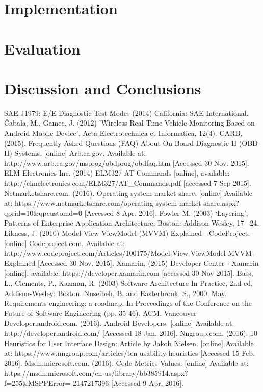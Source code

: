 \documentclass[12pt]{report}
\begin{document}
	\chapter{Implementation}
		
	\newpage

	\chapter{Evaluation}
		
	\newpage
	
	\chapter{Discussion and Conclusions}
				
	\newpage	
	

	\begin{thebibliography}{15}
		
		 SAE J1979:  E/E Diagnostic Test Modes (2014) California: SAE International.		
		 {\v C}abala, M., Gamec, J. (2012) 'Wireless Real-Time Vehicle Monitoring Based on Android Mobile Device', Acta Electrotechnica et Informatica, 12(4).
		 CARB, (2015). Frequently Asked Questions (FAQ) About On-Board Diagnostic II (OBD II) Systems. [online] Arb.ca.gov. Available at: http://www.arb.ca.gov/msprog/obdprog/obdfaq.htm [Accessed 30 Nov. 2015].
		 ELM Electronics Inc. (2014) ELM327 AT Commands [online], available: 	http://elmelectronics.com/ELM327/AT{\_}Commands.pdf [accessed 7 Sep 2015].
		 Netmarketshare.com. (2016). Operating system market share. [online] Available at: https://www.netmarketshare.com/operating-system-market-share.aspx?qprid=10{\&}qpcustomd=0 [Accessed 8 Apr. 2016].		
		 Fowler M. (2003) ‘Layering’, Patterns of Enterprise
	Application Architecture, Boston: Addison-Wesley, 17{-–}24.
		 Likness, J. (2010) Model-View-ViewModel (MVVM) Explained - CodeProject. [online] Codeproject.com. Available at: http://www.codeproject.com/Articles/100175/Model-View-ViewModel-MVVM-Explained [Accessed 30 Nov. 2015].
		 Xamarin, (2015) Developer Center - Xamarin [online], available: https://developer.xamarin.com [accessed 30 Nov 2015].
		 Bass, L., Clements, P., Kazman, R. (2003) Software Architecture In Practice, 2nd ed, Addison-Wesley: Boston.
		 Nuseibeh, B. and Easterbrook, S., 2000, May. Requirements engineering: a roadmap. In Proceedings of the Conference on the Future of Software Engineering (pp. 35-46). ACM.
Vancouver
		 Developer.android.com. (2016). Android Developers. [online] Available at: http://developer.android.com/ [Accessed 18 Jan. 2016].
		 Nngroup.com. (2016). 10 Heuristics for User Interface Design: Article by Jakob Nielsen. [online] Available at: https://www.nngroup.com/articles/ten-usability-heuristics [Accessed 15 Feb. 2016].
		 Msdn.microsoft.com. (2016). Code Metrics Values. [online] Available at: https://msdn.microsoft.com/en-us/library/bb385914.aspx?f=255{\&}MSPPError=-2147217396 [Accessed 9 Apr. 2016].
	\end{thebibliography}
		
\end{document}
